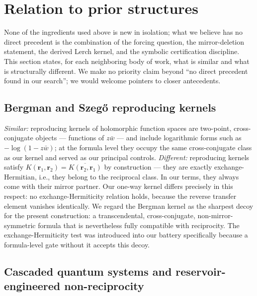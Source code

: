 \documentclass[11pt,a4paper]{article}
\newcommand{\wb}{\bar{w}}
\begin{document}
\section{Relation to prior structures}
\label{sec:prior}

None of the ingredients used above is new in isolation; what we believe has no
direct precedent is the combination of the forcing question, the mirror-deletion
statement, the derived Lerch kernel, and the symbolic certification discipline.
This section states, for each neighboring body of work, what is similar and what
is structurally different. We make no priority claim beyond ``no direct precedent
found in our search''; we would welcome pointers to closer antecedents.

\subsection{Bergman and Szeg\H{o} reproducing kernels}

\emph{Similar:} reproducing kernels of holomorphic function spaces are two-point,
cross-conjugate objects --- functions of $z\wb$ --- and include logarithmic forms
such as $-\log(1 - z\wb)$; at the formula level they occupy the same
cross-conjugate class as our kernel and served as our principal controls.
\emph{Different:} reproducing kernels satisfy
$K(\mathbf{r}_1, \mathbf{r}_2) = \overline{K(\mathbf{r}_2, \mathbf{r}_1)}$ by
construction --- they are exactly exchange-Hermitian, i.e., they belong to the
reciprocal class. In our terms, they always come with their mirror partner. Our
one-way kernel differs precisely in this respect: no exchange-Hermiticity
relation holds, because the reverse transfer element vanishes identically. We
regard the Bergman kernel as the sharpest decoy for the present construction: a
transcendental, cross-conjugate, non-mirror-symmetric formula that is
nevertheless fully compatible with reciprocity. The exchange-Hermiticity test
was introduced into our battery specifically because a formula-level gate
without it accepts this decoy.

\subsection{Cascaded quantum systems and reservoir-engineered non-reciprocity}
\end{document}
